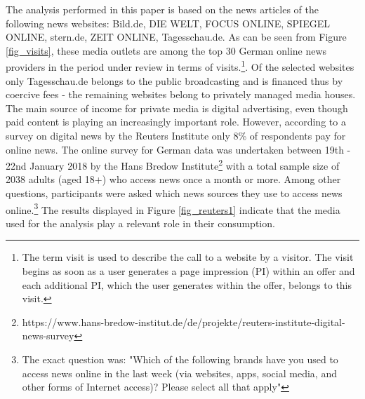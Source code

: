 \documentclass[12pt,a4paper,notitlepage]{article}
\begin{document}
The analysis performed in this paper is based on the news articles of the following news websites: Bild.de, DIE WELT, FOCUS ONLINE, SPIEGEL ONLINE, stern.de, ZEIT ONLINE, Tagesschau.de. As can be seen from  Figure \ref{fig_visits}, these media outlets are among the top 30 German online news providers in the period under review in terms of visits.\footnote{The term visit is used to describe the call to a website by a visitor. The visit begins as soon as a user generates a page impression (PI) within an offer and each additional PI, which the user generates within the offer, belongs to this visit.}. Of the selected websites only Tagesschau.de belongs to the public broadcasting and is financed thus by coercive fees - the remaining websites belong to privately managed media houses. The main source of income for private media is digital advertising, even though paid content is playing an increasingly important role. However, according to a survey on digital news by the Reuters Institute \citep{newman_reuters_2018} only 8\% of respondents pay for online news. The online survey for German data was undertaken between 19th - 22nd January 2018 by the Hans Bredow Institute\footnote{https://www.hans-bredow-institut.de/de/projekte/reuters-institute-digital-news-survey} with a total sample size of 2038 adults (aged 18+) who access news once a month or more. Among other questions, participants were asked which news sources they use to access news online.\footnote{The exact question was: "Which of the following brands have you used to access news online in the last week (via websites, apps, social media, and other forms of Internet access)? Please select all that apply"} The results displayed in Figure \ref{fig_reuters1} indicate that the media used for the analysis play a relevant role in their consumption.
\end{document}
